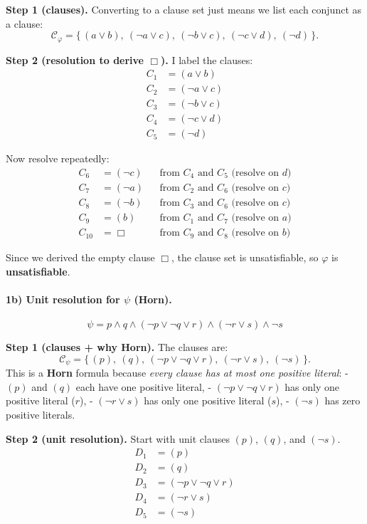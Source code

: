 \documentclass{article}
\theoremstyle{theorem}
\theoremstyle{definition}
\theoremstyle{remark}
\begin{document}
\textbf{Step 1 (clauses).} Converting to a clause set just means we list each conjunct as a clause:
\[
\mathcal{C}_\varphi = \{\, (a \lor b),\ (\neg a \lor c),\ (\neg b \lor c),\ (\neg c \lor d),\ (\neg d)\,\}.
\]

\textbf{Step 2 (resolution to derive $\Box$).} I label the clauses:
\begin{align*}
C_1&=(a\lor b) \\
C_2&=(\neg a\lor c) \\
C_3&=(\neg b\lor c) \\
C_4&=(\neg c\lor d) \\
C_5&=(\neg d)
\end{align*}

Now resolve repeatedly:
\begin{align*}
C_6&=(\neg c) &&\text{from } C_4 \text{ and } C_5 \text{ (resolve on } d\text{)}\\
C_7&=(\neg a) &&\text{from } C_2 \text{ and } C_6 \text{ (resolve on } c\text{)}\\
C_8&=(\neg b) &&\text{from } C_3 \text{ and } C_6 \text{ (resolve on } c\text{)}\\
C_9&=(b)      &&\text{from } C_1 \text{ and } C_7 \text{ (resolve on } a\text{)}\\
C_{10}&=\Box  &&\text{from } C_9 \text{ and } C_8 \text{ (resolve on } b\text{)}
\end{align*}

Since we derived the empty clause $\Box$, the clause set is unsatisfiable, so $\varphi$ is \textbf{unsatisfiable}.

\paragraph{1b) Unit resolution for $ \psi $ (Horn).}
\[
\psi= p \land q \land (\neg p \lor \neg q \lor r)\land(\neg r \lor s)\land \neg s
\]

\textbf{Step 1 (clauses + why Horn).} The clauses are:
\[
\mathcal{C}_\psi=\{\, (p),\ (q),\ (\neg p\lor \neg q \lor r),\ (\neg r\lor s),\ (\neg s)\,\}.
\]
This is a \textbf{Horn} formula because \emph{every clause has at most one positive literal}:
- $(p)$ and $(q)$ each have one positive literal,
- $(\neg p\lor \neg q \lor r)$ has only one positive literal ($r$),
- $(\neg r\lor s)$ has only one positive literal ($s$),
- $(\neg s)$ has zero positive literals.

\textbf{Step 2 (unit resolution).} Start with unit clauses $(p)$, $(q)$, and $(\neg s)$.
\begin{align*}
D_1&=(p)\\
D_2&=(q)\\
D_3&=(\neg p\lor \neg q \lor r)\\
D_4&=(\neg r\lor s)\\
D_5&=(\neg s)
\end{align*}
\end{document}
